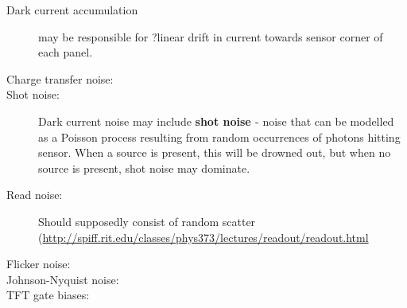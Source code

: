 \documentclass[10pt,fleqn]{article}
\begin{document}
\begin{description}

\item[Dark current accumulation] may be responsible for ?linear drift in current towards sensor corner of each panel.

\item[Charge transfer noise: ] 

\item[Shot noise: ] Dark current noise may include \textbf{shot noise \cite{wiki:ShotNoise}} - noise that can be modelled as a Poisson process resulting from random occurrences of photons hitting sensor. When a source is present, this will be drowned out, but when no source is present, shot noise may dominate. 

\item[Read noise: ] Should supposedly consist of random scatter (\url{http://spiff.rit.edu/classes/phys373/lectures/readout/readout.html} \\

\item[Flicker noise: ]

\item[Johnson-Nyquist noise: ]

\item[TFT gate biases: ]

\end{description}

\hrulefill
\printbibliography
\end{document}
